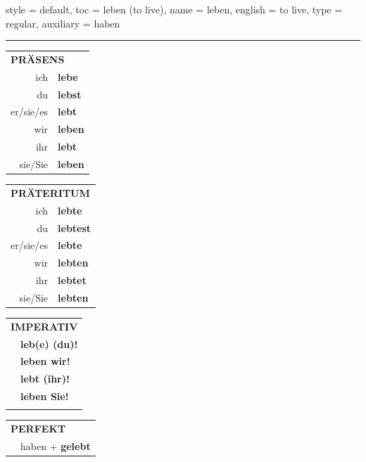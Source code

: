 \begin{verbentry}{
  style = {default},
  toc = {leben (to live)},
  name = {leben},
  english = {to live},
  type = {regular},
  auxiliary = {haben}
}
 
    
     \vspace{5pt}

    \hrule
    
    \vspace{5pt}

  \begin{tabular}{rl}
     \multicolumn{2}{l}{\textbf{PRÄSENS} }\\
    ich & \textbf{lebe}\\
    du & \textbf{lebst}\\
    er/sie/es & \textbf{lebt}\\
    wir & \textbf{leben}\\
    ihr & \textbf{lebt}\\
    sie/Sie & \textbf{leben}\\
  \end{tabular}
  \hfill
     \begin{tabular}{rl}
    \multicolumn{2}{l}{\textbf{PRÄTERITUM} }\\
    ich & \textbf{lebte}\\
    du & \textbf{lebtest}\\
    er/sie/es & \textbf{lebte}\\
    wir & \textbf{lebten}\\
    ihr & \textbf{lebtet}\\
    sie/Sie & \textbf{lebten}\\
  \end{tabular}
  \hfill
  \begin{tabular}{rl}
     \multicolumn{2}{l}{\textbf{IMPERATIV} }\\
   & \textbf{leb(e) (du)!}\\
   & \textbf{leben wir!}\\
   & \textbf{lebt (ihr)!}\\
   & \textbf{leben Sie!}\\
   & \vspace{10pt}
  \end{tabular}

    \vspace{10pt}

 \begin{tabular}{rl}
     \multicolumn{2}{l}{\textbf{PERFEKT}}\\
   & haben + \textbf{gelebt}\\
  \end{tabular}
\hfill
   \begin{tabular}{rl}
   

\end{tabular}
\end{verbentry}
